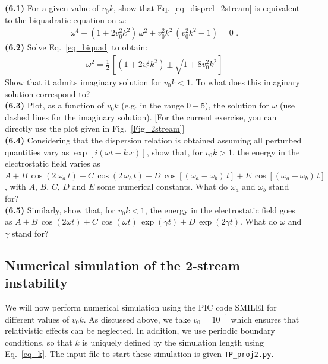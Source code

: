 \documentclass[11pt,a4paper]{article}
\begin{document}
$ $\\
\\
{\bf (6.1)} For a given value of $v_0 k$, show that Eq.~\eqref{eq_disprel_2stream} is equivalent to the biquadratic equation on $\omega$:
\begin{eqnarray}\label{eq_biquad}
\omega^4 - (1+2 v_0^2 k^2)\,\omega^2 + v_0^2 k^2\,(v_0^2 k^2-1) = 0\,\,.
\end{eqnarray}
{\bf (6.2)} Solve Eq.~\eqref{eq_biquad} to obtain:
\begin{eqnarray}
\omega^2 = \frac{1}{2}\,\left[ (1+2 v_0^2 k^2) \pm \sqrt{1+8 v_0^2 k^2} \right]
\end{eqnarray}
Show that it admits imaginary solution for $v_0 k<1$. To what does this imaginary solution correspond to?\\
{\bf (6.3)} Plot, as a function of $v_0 k$ (e.g. in the range $0 - 5$),  the solution for $\omega$ (use dashed lines for the imaginary solution). [For the current exercise, you can directly use the plot given in Fig.~\ref{Fig_2stream}]\\
{\bf (6.4)} Considering that the dispersion relation is obtained assuming all perturbed quantities vary as $\exp[i(\omega t - k\,x)]$, show that, for $v_0 k>1$, the energy in the electrostatic field varies as $A + B\,\cos(2\,\omega_a\,t) + C\,\cos(2\,\omega_b\,t) + D\,\cos[(\omega_a-\omega_b)\,t] + E\,\cos[(\omega_a+\omega_b)\,t]$, with $A$, $B$, $C$, $D$ and $E$ some numerical constants. What do $\omega_a$ and $\omega_b$ stand for?\\
{\bf (6.5)} Similarly, show that, for $v_0 k<1$, the energy in the electrostatic field goes as $A + B\,\cos(2\omega t) + C\,\cos(\omega t)\,\exp(\gamma t)+D\,\exp(2\gamma t)$. What do $\omega$ and $\gamma$ stand for? 

\subsection*{Numerical simulation of the 2-stream instability}

We will now perform numerical simulation using the PIC code SMILEI for different values of $v_0 k$.
As discussed above, we take $v_0=10^{-1}$ which ensures that relativistic effects can be neglected.
In addition, we use periodic boundary conditions, so that $k$ is uniquely defined by the simulation length using Eq.~\eqref{eq_k}.
The input file to start these simulation is given \texttt{TP\_proj2.py}.
\end{document}
